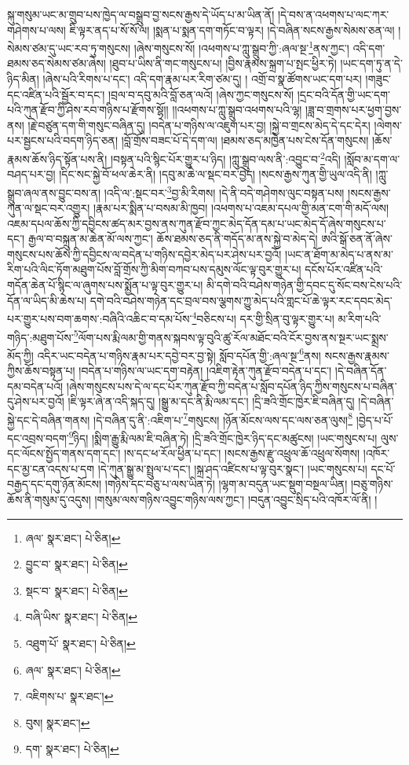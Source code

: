 སྐུ་གསུམ་ཡང་མ་གྲུབ་པས་ཁྱེད་ལ་བསྒྲུབ་བྱ་སངས་རྒྱས་དེ་ཡོད་པ་མ་ཡིན་ནོ། །དེ་བས་ན་འཕགས་པ་ལང་ཀར་གཤེགས་པ་ལས། ཇི་ལྟར་ནད་པ་སོ་སོ་ལ། །སྨན་པ་སྨན་དག་གཏོང་བ་ལྟར། །དེ་བཞིན་སངས་རྒྱས་སེམས་ཅན་ལ། །སེམས་ཙམ་དུ་ཡང་རབ་ཏུ་གསུངས། །ཞེས་གསུངས་སོ། །འཕགས་པ་ཀླུ་སྒྲུབ་ཀྱི་:ཞལ་སྔ་\footnote{ཞལ་  སྣར་ཐང་།  པེ་ཅིན། }ནས་ཀྱང་། འདི་དག་ཐམས་ཅད་སེམས་ཙམ་ཞེས། །ཐུབ་པ་ཡིས་ནི་གང་གསུངས་པ། །བྱིས་རྣམས་སྐྲག་པ་སྤང་ཕྱིར་ཏེ། །ཡང་དག་ཏུ་ན་དེ་ཉིད་མིན། །ཞེས་པའི་རིགས་པ་དང་། འདི་དག་རྣམ་པར་རིག་ཙམ་དུ། །
འགྲོ་བ་སྣ་ཚོགས་ཡང་དག་པར། །གཟུང་དང་འཛིན་པའི་སྦྱོར་བ་དང་། །བྲལ་བ་དབུ་མའི་བློ་ཅན་ལའོ། །ཞེས་ཀྱང་གསུངས་སོ། །དྲང་བའི་དོན་གྱི་ཡང་དག་པའི་ཀུན་རྫོབ་ཀྱི་ཤེས་རབ་གཉིས་པ་རྫོགས་སྷོ།། །།འཕགས་པ་ཀླུ་སྒྲུབ་འཕགས་པའི་ལྷ། །ཟླ་བ་གྲགས་པར་ཕྱག་བྱས་ནས། །རྗེ་བཙུན་དག་གི་གསུང་བཞིན་དུ། །བདེན་པ་གཉིས་ལ་འཇུག་པར་བྱ། །སྐྱེ་བ་གྲངས་མེད་དེ་དང་དེར། །ལེགས་པར་སྦྱངས་པའི་བདག་ཉིད་ཅན། །བློ་གྲོས་བཟང་པོ་དེ་དག་ལ། །ཐམས་ཅད་མཁྱེན་པས་ངེས་དོན་གསུངས། །ཆོས་རྣམས་ཆོས་ཉིད་སྟོན་པས་ནི། །བསྟན་པའི་སྙིང་པོར་གྱུར་པ་ཉིད། །ཀླུ་སྒྲུབ་ལས་ནི་:འབྱུང་བ་\footnote{བྱུང་བ་  སྣར་ཐང་།  པེ་ཅིན། }འདི། །སློབ་མ་དག་ལ་བཤད་པར་བྱ། །དིང་སང་སྐྱེ་བོ་ཕལ་ཆེར་ནི། །དབུ་མ་ཆེ་ལ་སྡང་བར་བྱེད། །སངས་རྒྱས་ཀུན་གྱི་ཡུལ་འདི་ནི། །ཀླུ་སྒྲུབ་ཞལ་ནས་བྱུང་བས་ན། །འདི་ལ་:སྡང་བར་\footnote{སྡང་བ་  སྣར་ཐང་།  པེ་ཅིན། }བྱ་མི་རིགས། །དེ་ནི་བདེ་གཤེགས་ལུང་བསྟན་པས། །སངས་རྒྱས་ཀུན་ལ་སྡང་བར་འགྱུར། །རྣམ་པར་སྨིན་པ་བསམ་མི་ཁྱབ། །འཕགས་པ་འཇམ་དཔལ་གྱི་མན་ངག་གི་མདོ་ལས། འཇམ་དཔལ་ཆོས་ཀྱི་དབྱིངས་ཚད་མར་བྱས་ནས་ཀུན་རྫོབ་ཀྱང་མེད་དོན་དམ་པ་ཡང་མེད་དོ་ཞེས་གསུངས་པ་དང་། རྒྱལ་བ་བསྐྲུན་མ་ཆེན་མོ་ལས་ཀྱང་། ཆོས་ཐམས་ཅད་ནི་གདོད་མ་ནས་སྐྱེ་བ་མེད་དེ། ཨའི་སྒོ་ཅན་ནོ་ཞེས་གསུངས་པས་ཆོས་ཀྱི་དབྱིངས་ལ་བདེན་པ་གཉིས་དབྱེར་མེད་པར་ཤེས་པར་བྱའོ། །ཡང་ན་ཐོག་མ་མེད་པ་ནས་མ་རིག་པའི་ལིང་ཏོག་མཐུག་པོས་བློ་གྲོས་ཀྱི་མིག་བཀབ་པས་དམུས་ལོང་ལྟ་བུར་གྱུར་པ། དངོས་པོར་འཛིན་པའི་གདོན་ཆེན་པོ་སྙིང་ལ་ཞུགས་པས་སྨྱོན་པ་ལྟ་བུར་གྱུར་པ། མི་དགེ་བའི་བཤེས་གཉེན་གྱི་དབང་དུ་སོང་བས་ངེས་པའི་དོན་ལ་ཡིད་མི་ཆེས་པ། དགེ་བའི་བཤེས་གཉེན་དང་བྲལ་བས་ལྕགས་ཀྱུ་མེད་པའི་གླང་པོ་ཆེ་ལྟར་རང་དབང་མེད་པར་གྱུར་པས་བག་ཆགས་:བཞིའི་འཆིང་བ་དམ་པོས་\footnote{བཞི་ཡིས་  སྣར་ཐང་།  པེ་ཅིན། }བཅིངས་པ། དར་གྱི་སྲིན་བུ་ལྟར་གྱུར་པ། མ་རིག་པའི་གཉིད་:མཐུག་པོས་\footnote{འཐུག་པོ་  སྣར་ཐང་།  པེ་ཅིན། }ལོག་པས་རྨི་ལམ་གྱི་གནས་སྐབས་ལྟ་བུའི་ཚུ་རོལ་མཐོང་བའི་ངོར་བྱས་ནས་སྔར་ཡང་སྨྲས་མོད་ཀྱི། འདིར་ཡང་བདེན་པ་གཉིས་རྣམ་པར་དབྱེ་བར་བྱ་སྟེ། སློབ་དཔོན་གྱི་:ཞལ་སྔ་\footnote{ཞལ་  སྣར་ཐང་།  པེ་ཅིན། }ནས། སངས་རྒྱས་རྣམས་ཀྱིས་ཆོས་བསྟན་པ། །བདེན་པ་གཉིས་ལ་ཡང་དག་བརྟེན། །འཇིག་རྟེན་ཀུན་རྫོབ་བདེན་པ་དང་། །དེ་བཞིན་དོན་དམ་བདེན་པའོ། །ཞེས་གསུངས་པས་དེ་ལ་དང་པོར་ཀུན་རྫོབ་ཀྱི་བདེན་པ་སློབ་དཔོན་ཉིད་ཀྱིས་གསུངས་པ་བཞིན་དུ་ཤེས་པར་བྱའོ། །ཇི་ལྟར་ཞེ་ན་འདི་སྐད་དུ། །སྒྱུ་མ་དང་ནི་རྨི་ལམ་དང་། །དྲི་ཟའི་གྲོང་ཁྱེར་ཇི་བཞིན་དུ། །དེ་བཞིན་སྐྱེ་དང་དེ་བཞིན་གནས། །དེ་བཞིན་དུ་ནི་:འཇིག་པ་\footnote{འཇིགས་པ་  སྣར་ཐང་། }གསུངས། །ཉོན་མོངས་ལས་དང་ལས་ཅན་ལུས།\footnote{བུས།  སྣར་ཐང་། } །བྱེད་པ་པོ་དང་འབྲས་བདག་\footnote{དག་  སྣར་ཐང་།  པེ་ཅིན། }ཉིད། །སྨིག་རྒྱུ་རྨི་ལམ་ཇི་བཞིན་ཏེ། །དྲི་ཟའི་གྲོང་ཁྱེར་ཉིད་དང་མཚུངས། །ཡང་གསུངས་པ། ལུས་དང་ལོངས་སྤྱོད་གནས་དག་དང་། །ས་དང་ཕ་རོལ་ཕྱིན་པ་དང་། །སངས་རྒྱས་རྫུ་འཕྲུལ་ཆོ་འཕྲུལ་སོགས། །འཁོར་དང་མྱ་ངན་འདས་པ་དག །དེ་ཀུན་སྒྱུ་མ་སྤྲུལ་པ་དང་། །སྐྲ་ཤད་འཛིངས་པ་ལྟ་བུར་སྣང་། །ཡང་གསུངས་པ། དང་པོ་བརྒྱད་དང་དགུ་ཉོན་མོངས། །གཉིས་དང་བཅུ་པ་ལས་ཡིན་ཏེ། །ལྷག་མ་བདུན་ཡང་སྡུག་བསྔལ་ཡིན། །བཅུ་གཉིས་ཆོས་ནི་གསུམ་དུ་འདུས། །གསུམ་ལས་གཉིས་འབྱུང་གཉིས་ལས་ཀྱང་། །བདུན་འབྱུང་སྲིད་པའི་འཁོར་ལོ་ནི། །
